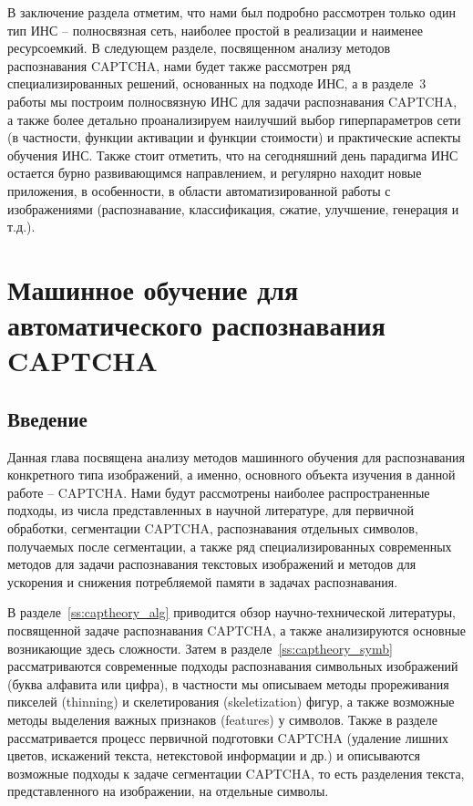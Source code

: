 \documentclass[a4paper,12pt,russian]{article} %
\begin{document}
В заключение раздела отметим, что нами был подробно рассмотрен только один тип ИНС -- полносвязная сеть, наиболее простой в реализации и наименее ресурсоемкий.
В следующем разделе, посвященном анализу методов распознавания CAPTCHA, нами будет также рассмотрен ряд специализированных решений, основанных на подходе ИНС, а в разделе~3 работы мы построим полносвязную ИНС для задачи распознавания CAPTCHA, а также более детально проанализируем наилучший выбор гиперпараметров сети (в частности, функции активации и функции стоимости) и практические аспекты обучения ИНС.
Также стоит отметить, что на сегодняшний день парадигма ИНС остается бурно развивающимся направлением, и регулярно находит новые приложения, в особенности, в области автоматизированной работы с изображениями (распознавание, классификация, сжатие, улучшение, генерация и т.д.).

\newpage
\section{Машинное обучение для автоматического распознавания CAPTCHA} \label{s:captheory}

\subsection{Введение} \label{ss:captheory_intro}

Данная глава посвящена анализу методов машинного обучения для распознавания конкретного типа изображений, а именно, основного объекта изучения в данной работе -- CAPTCHA.
Нами будут рассмотрены наиболее распространенные подходы, из числа представленных в научной литературе, для первичной обработки, сегментации CAPTCHA, распознавания отдельных символов, получаемых после сегментации, а также ряд специализированных современных методов для задачи распознавания текстовых изображений и методов для ускорения и снижения потребляемой памяти в задачах распознавания.

В разделе~\ref{ss:captheory_alg} приводится обзор научно-технической литературы, посвященной задаче распознавания CAPTCHA, а также анализируются основные возникающие здесь сложности.
Затем в разделе~\ref{ss:captheory_symb} рассматриваются современные подходы распознавания символьных изображений (буква алфавита или цифра), в частности мы описываем методы прореживания пикселей (thinning) и скелетирования (skeletization) фигур, а также возможные методы выделения важных признаков (features) у символов.
Также в разделе рассматривается процесс первичной подготовки CAPTCHA (удаление лишних цветов, искажений текста, нетекстовой информации и др.) и описываются возможные подходы к задаче сегментации CAPTCHA, то есть разделения текста, представленного на изображении, на отдельные символы.
\end{document}
